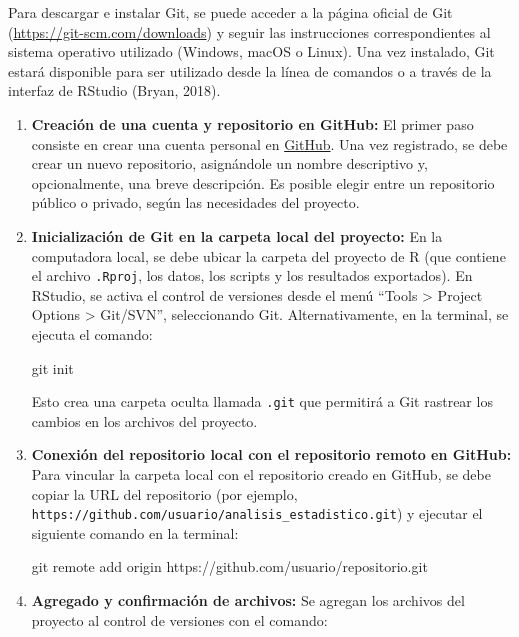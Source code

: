 \documentclass[
  spanish,
  a4paper,
  DIV=11,
  numbers=noendperiod,
  onepage,
  openany]{scrreprt}
\newenvironment{Shaded}{\begin{snugshade}}{\end{snugshade}}
\newcommand{\ErrorTok}[1]{\textcolor[rgb]{0.68,0.00,0.00}{#1}}
\newcommand{\NormalTok}[1]{\textcolor[rgb]{0.00,0.23,0.31}{#1}}
\newcommand{\SpecialCharTok}[1]{\textcolor[rgb]{0.37,0.37,0.37}{#1}}
\begin{document}
Para descargar e instalar Git, se puede acceder a la página oficial de
Git (\url{https://git-scm.com/downloads}) y seguir las instrucciones
correspondientes al sistema operativo utilizado (Windows, macOS o
Linux). Una vez instalado, Git estará disponible para ser utilizado
desde la línea de comandos o a través de la interfaz de RStudio (Bryan,
2018).

\begin{enumerate}
\def\labelenumi{\arabic{enumi}.}
\item
  \textbf{Creación de una cuenta y repositorio en GitHub:} El primer
  paso consiste en crear una cuenta personal en
  \href{https://github.com/}{GitHub}. Una vez registrado, se debe crear
  un nuevo repositorio, asignándole un nombre descriptivo y,
  opcionalmente, una breve descripción. Es posible elegir entre un
  repositorio público o privado, según las necesidades del proyecto.
\item
  \textbf{Inicialización de Git en la carpeta local del proyecto:} En la
  computadora local, se debe ubicar la carpeta del proyecto de R (que
  contiene el archivo \texttt{.Rproj}, los datos, los scripts y los
  resultados exportados). En RStudio, se activa el control de versiones
  desde el menú ``Tools \textgreater{} Project Options \textgreater{}
  Git/SVN'', seleccionando Git. Alternativamente, en la terminal, se
  ejecuta el comando:

\begin{Shaded}
\begin{Highlighting}[]
\NormalTok{git init}
\end{Highlighting}
\end{Shaded}

  Esto crea una carpeta oculta llamada \texttt{.git} que permitirá a Git
  rastrear los cambios en los archivos del proyecto.
\item
  \textbf{Conexión del repositorio local con el repositorio remoto en
  GitHub:} Para vincular la carpeta local con el repositorio creado en
  GitHub, se debe copiar la URL del repositorio (por ejemplo,
  \texttt{https://github.com/usuario/analisis\_estadistico.git}) y
  ejecutar el siguiente comando en la terminal:

\begin{Shaded}
\begin{Highlighting}[]
\NormalTok{git remote add origin https}\SpecialCharTok{:}\ErrorTok{//}\NormalTok{github.com}\SpecialCharTok{/}\NormalTok{usuario}\SpecialCharTok{/}\NormalTok{repositorio.git}
\end{Highlighting}
\end{Shaded}
\item
  \textbf{Agregado y confirmación de archivos:} Se agregan los archivos
  del proyecto al control de versiones con el comando:


\end{enumerate}
\end{document}
